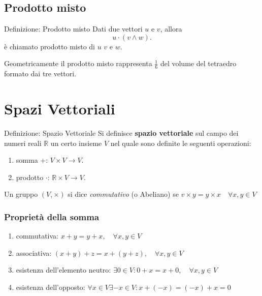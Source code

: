 \documentclass[x11names]{article}
\begin{document}
\subsection{Prodotto misto}

\begin{center}
\colorbox{myblue}{\begin{minipage}{5.75in}
\begin{blues}{Definizione: Prodotto misto}
Dati due vettori $u$ e $v$, allora
\[
u \cdot \left(v \wedge w\right)
.\] 
è chiamato prodotto misto di $u$ $v$ e  $w$.
\end{blues}
\end{minipage}}        
\end{center}
Geometricamente il prodotto misto rappresenta $\frac{1}{6}$ del volume del tetraedro formato dai tre vettori.



\newpage
\section{Spazi Vettoriali}
\begin{center}
\colorbox{myblue}{\begin{minipage}{5.75in}
\begin{blues}{Definizione: Spazio Vettoriale}
    Si definisce \textbf{spazio vettoriale} sul campo dei numeri reali $\mathbb{R}$ un certo insieme $V$ nel quale sono definite le seguenti operazioni:
    \begin{enumerate}
        \item somma $+$: $V \times V \longrightarrow V$.
        \item prodotto $\cdot$: $\mathbb{R} \times V \longrightarrow V$.
        \end{enumerate}
	Un gruppo $\left(V,\times \right)$ si dice \textit{commutativo} (o Abeliano) se $v \times y = y \times x \quad \forall x,y \in V$
\end{blues}
\end{minipage}}        
\end{center}


\subsubsection{Proprietà della somma}
\begin{enumerate}
    \item commutativa: $x + y = y + x, \quad \forall x,y \in V$
    \item associativa: $(x+y)+z = x + (y+z),\quad \forall x,y \in V$
    \item esistenza dell'elemento neutro: $\exists 0 \in V : 0 + x = x +0, \quad \forall x,y \in V$
    \item esistenza dell'opposto: $\forall x \in V \exists -x \in V : x + (-x) = (-x) +x = 0$
\end{enumerate}
\end{document}
